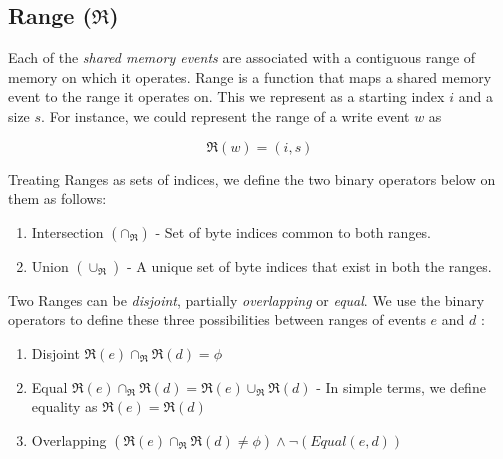     \subsection{Range ($\Re$)}
        Each of the \textit{shared memory events} are associated with a contiguous range of memory on which it operates. 
        Range is a function that maps a shared memory event to the range it operates on\footnotemark. 
        This we represent as a starting index $i$ and a size $s$. 
        For instance, we could represent the range of a write event $w$ as 
                
                \[\Re(w) = (i, s) \]
    
        
        Treating Ranges as sets of indices, we define the two binary operators below on them as follows:
        \begin{enumerate}
            \item Intersection $(\cap{_\Re})$ - Set of byte indices common to both ranges.
            \item Union $(\cup_\Re)$ - A unique set of byte indices that exist in both the ranges.  
        \end{enumerate}
        
        Two Ranges can be \textit{disjoint}, partially \textit{overlapping} or \textit{equal}. 
        We use the binary operators to define these three possibilities between ranges of events $e$ and $d$ :
        \begin{enumerate}
            \item Disjoint $\Re(e) \cap_\Re \Re(d) = \phi$ 
            \item Equal $\Re(e) \cap_\Re  \Re(d) = \Re(e) \cup_\Re \Re(d)$ - In simple terms, we define equality as $\Re(e) = \Re(d)$
            \item Overlapping $(\Re(e)\cap_\Re \Re(d) \neq \phi) \wedge \neg(Equal(e,d))$    
        \end{enumerate}
            
    
